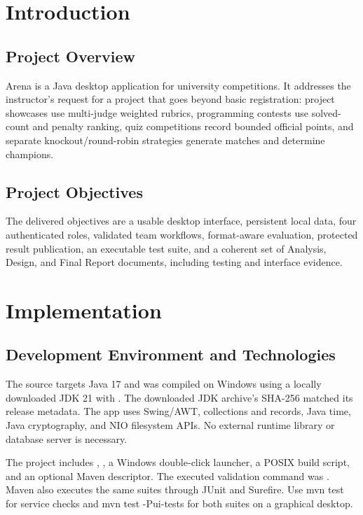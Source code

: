 \documentclass[12pt]{article}
\begin{document}
\section{Introduction}
\subsection{Project Overview}
Arena is a Java desktop application for university competitions. It addresses the instructor's request for a project that goes beyond basic registration: project showcases use multi-judge weighted rubrics, programming contests use solved-count and penalty ranking, quiz competitions record bounded official points, and separate knockout/round-robin strategies generate matches and determine champions.
\subsection{Project Objectives}
The delivered objectives are a usable desktop interface, persistent local data, four authenticated roles, validated team workflows, format-aware evaluation, protected result publication, an executable test suite, and a coherent set of Analysis, Design, and Final Report documents, including testing and interface evidence.

\section{Implementation}
\subsection{Development Environment and Technologies}
The source targets Java 17 and was compiled on Windows using a locally downloaded JDK 21 with . The downloaded JDK archive's SHA-256 matched its release metadata. The app uses Swing/AWT, collections and records, Java time, Java cryptography, and NIO filesystem APIs. No external runtime library or database server is necessary.

The project includes , , a Windows double-click launcher, a POSIX build script, and an optional Maven descriptor. The executed validation command was . Maven also executes the same suites through JUnit and Surefire. Use mvn test for service checks and mvn test -Pui-tests for both suites on a graphical desktop.
\end{document}
